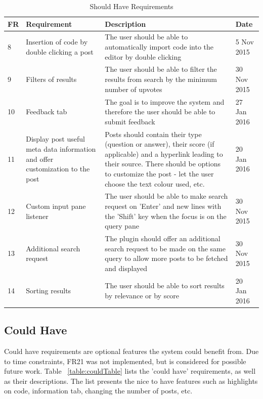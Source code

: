 \documentclass{l4proj}
\begin{document}
\begin{table}[H]
\caption{Should Have Requirements}
\centering
\def\arraystretch{1.5}
\begin{tabular}{p{0.5cm}p{4cm}p{9cm}p{2cm}}
\hline
FR & Requirement & Description & Date \\
\hline
8 & Insertion of code by double clicking a post & The user should be able to automatically import code into the editor by double clicking & 5 Nov 2015\\
9 & Filters of results & The user should be able to filter the results from search by the minimum number of upvotes & 30 Nov 2015\\
10 & Feedback tab & The goal is to improve the system and therefore the user should be able to submit feedback & 27 Jan 2016\\
11 & Display post useful meta data information and offer customization to the post & Posts should contain their type (question or answer), their score (if applicable) and a hyperlink leading to their source. There should be options to customize the post - let the user choose the text colour used, etc. & 20 Jan 2016\\
12 & Custom input pane listener & The user should be able to make search request on 'Enter' and new lines with the 'Shift' key when the focus is on the query pane & 30 Nov 2015\\
13 & Additional search request & The plugin should offer an additional search request to be made on the same query to allow more posts to be fetched and displayed & 30 Nov 2015\\
14 & Sorting results & The user should be able to sort results by relevance or by score & 20 Jan 2016\\
\hline
\end{tabular}
\label{table:shouldTable}
\end{table}

\subsection{Could Have}
Could have requirements are optional features the system could benefit from. Due to time constraints, FR21 was not implemented, but is considered for possible future work. Table ~\ref{table:couldTable}  lists the 'could have' requirements, as well as their descriptions. The list presents the nice to have features such as highlights on code, information tab, changing the number of posts, etc.
\end{document}
